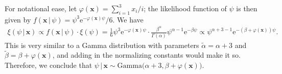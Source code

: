 \documentclass[10pt]{article}
\begin{document}
\begin{itemize}
    For notational ease, let \(\varphi(\mathbf{x}) = \sum_{i=1}^3 x_i / i\); the likelihood function of \(\psi\) is then given by 
    \(f(\mathbf{x} \,|\, \psi) = \psi^3 \mathrm{e}^{- \varphi(\mathbf{x}) \psi} / 6\). We have 
    \begin{align*}
        \xi(\psi \,|\, \mathbf{x})
        \propto f(\mathbf{x} \,|\, \psi) \cdot \xi(\psi) 
        = \frac{1}{6} \psi^3 \mathrm{e}^{- \varphi(\mathbf{x}) \psi} \cdot \frac{\beta^{\alpha}}{\Gamma(\alpha)} \psi^{\alpha - 1} \mathrm{e}^{-\beta \psi}
        \propto \psi^{\alpha + 3 - 1} \mathrm{e}^{-(\beta + \varphi(\mathbf{x})) \psi}.
    \end{align*}
    This is very similar to a Gamma distribution with parameters \(\tilde{\alpha} = \alpha + 3\) and \(\tilde{\beta} = \beta + \varphi(\mathbf{x})\), and adding 
    in the normalizing constants would make it so. Therefore, we conclude that \(\psi \,|\, \mathbf{x} \sim \mathrm{Gamma} \big( \alpha + 3, \beta + \varphi(\mathbf{x}) \big)\).
\end{itemize}

\end{document}
